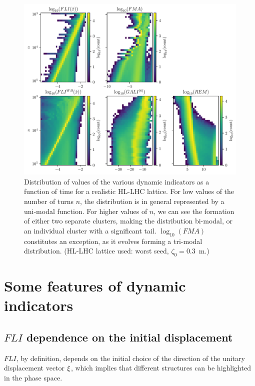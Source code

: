 \begin{figure}
    \centering
    \includegraphics[width=1.0\textwidth]{6_lhc_dynamic_indicators/figs/updated/evolution.pdf}
    \caption{Distribution of values of the various dynamic indicators as a function of time for a realistic HL-LHC lattice. For low values of the number of turns $n$, the distribution is in general represented by a uni-modal function. For higher values of $n$, we can see the formation of either two separate clusters, making the distribution bi-modal, or an individual cluster with a significant tail. $\log_{10}(FMA)$ constitutes an exception, as it evolves forming a tri-modal distribution. (HL-LHC lattice used: worst seed, $\zeta_0=$\SI{0.3}{\meter}.)}
    \label{fig:overview2}
\end{figure}

\section{Some features of dynamic indicators}\label{sec:8:features}

\subsection{$FLI$ dependence on the initial displacement}

$FLI$, by definition, depends on the initial choice of the direction of the unitary displacement vector $\vb{\xi}$, which implies that different structures can be highlighted in the phase space.

